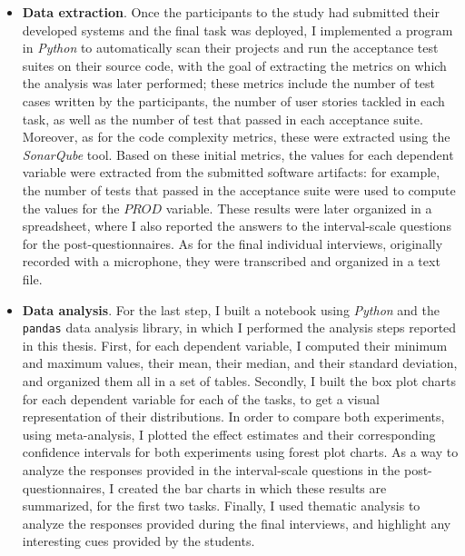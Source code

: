 \begin{itemize}
    \item \textbf{Data extraction}. 
    Once the participants to the study had submitted their developed systems and the final task was deployed, I implemented a program in \textit{Python} to automatically scan their projects and run the acceptance test suites on their source code, with the goal of extracting the metrics on which the analysis was later performed; these metrics include the number of test cases written by the participants, the number of user stories tackled in each task, as well as the number of test that passed in each acceptance suite.
    Moreover, as for the code complexity metrics, these were extracted using the \textit{SonarQube} tool. Based on these initial metrics, the values for each dependent variable were extracted from the submitted software artifacts: for example, the number of tests that passed in the acceptance suite were used to compute the values for the $PROD$ variable.
    These results were later organized in a spreadsheet, where I also reported the answers to the interval-scale questions for the post-questionnaires. As for the final individual interviews, originally recorded with a microphone, they were transcribed and organized in a text file.

    \item\textbf{Data analysis}.
    For the last step, I built a notebook using \textit{Python} and the \texttt{pandas} data analysis library, in which I performed the analysis steps reported in this thesis. 
    First, for each dependent variable, I computed their minimum and maximum values, their mean, their median, and their standard deviation, and organized them all in a set of tables.
    Secondly, I built the box plot charts for each dependent variable for each of the tasks, to get a visual representation of their distributions.
    In order to compare both experiments, using meta-analysis, I plotted the effect estimates and their corresponding confidence intervals for both experiments using forest plot charts.
    As a way to analyze the responses provided in the interval-scale questions in the post-questionnaires, I created the bar charts in which these results are summarized, for the first two tasks.
    Finally, I used thematic analysis to analyze the responses provided during the final interviews, and highlight any interesting cues provided by the students.
\end{itemize}
